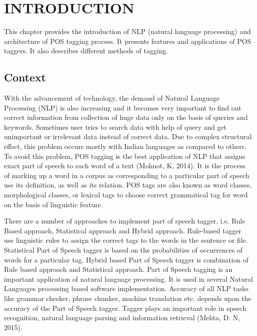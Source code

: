 \documentclass[12pt,a4paper,oneside]{memoir}
\begin{document}
\newpage


\tableofcontents*

\newpage
\listoffigures
\newpage
\listoftables
\clearpage





\chapter{INTRODUCTION}

This chapter provides the introduction of NLP (natural language processing) and architecture of POS tagging process. It presents features and applications of POS taggers.  It also describes different methods of tagging.

\section{Context}

With the advancement of technology, the demand of Natural Language Processing (NLP) is also increasing and it becomes very important to find out correct information from collection of huge data only on the basis of queries and keywords. Sometimes user tries to search data with help of query and get unimportant or irrelevant data instead of correct data. Due to complex structural effect, this problem occurs mostly with Indian languages as compared to others. To avoid this problem, POS tagging is the best application of NLP that assigns exact part of speech to each word of a text (Mohnot, K, 2014). It is the process of marking up a word in a corpus as corresponding to a particular part of speech use its definition, as well as its relation. POS tags are also known as word classes, morphological classes, or lexical tags to choose correct grammatical tag for word on the basis of linguistic feature. 

There are a number of approaches to implement part of speech tagger, i.e. Rule Based approach, Statistical approach and Hybrid approach. Rule-based tagger use linguistic rules to assign the correct tags to the words in the sentence or file. Statistical Part of Speech tagger is based on the probabilities of occurrences of words for a particular tag. Hybrid based Part of Speech tagger is combination of Rule based approach and Statistical approach. Part of Speech tagging is an important application of natural language processing. It is used in several Natural Languages processing based software implementation. Accuracy of all NLP tasks like grammar checker, phrase chunker, machine translation etc. depends upon the accuracy of the Part of Speech tagger. Tagger plays an important role in speech recognition, natural language parsing and information retrieval (Mehta, D. N, 2015).
\end{document}
